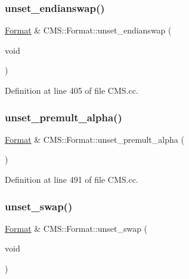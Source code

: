\mbox{\label{class_c_m_s_1_1_format_abb7b1e1f28cb8ca2b259ec7cb8ad1d56}} 
\subsubsection{\texorpdfstring{unset\+\_\+endianswap()}{unset\_endianswap()}}
{\footnotesize\ttfamily \hyperlink{class_c_m_s_1_1_format}{Format} \& C\+M\+S\+::\+Format\+::unset\+\_\+endianswap (\begin{DoxyParamCaption}\item[{void}]{ }\end{DoxyParamCaption})}



Definition at line 405 of file C\+M\+S.\+cc.

\mbox{\label{class_c_m_s_1_1_format_a2075b55ec46e6f7cfa2900e5b137e2e8}} 
\subsubsection{\texorpdfstring{unset\+\_\+premult\+\_\+alpha()}{unset\_premult\_alpha()}}
{\footnotesize\ttfamily \hyperlink{class_c_m_s_1_1_format}{Format} \& C\+M\+S\+::\+Format\+::unset\+\_\+premult\+\_\+alpha (\begin{DoxyParamCaption}{ }\end{DoxyParamCaption})}



Definition at line 491 of file C\+M\+S.\+cc.

\mbox{\label{class_c_m_s_1_1_format_a3dc342e4e9b121ae8344a50eb53de093}} 
\subsubsection{\texorpdfstring{unset\+\_\+swap()}{unset\_swap()}}
{\footnotesize\ttfamily \hyperlink{class_c_m_s_1_1_format}{Format} \& C\+M\+S\+::\+Format\+::unset\+\_\+swap (\begin{DoxyParamCaption}\item[{void}]{ }\end{DoxyParamCaption})}




